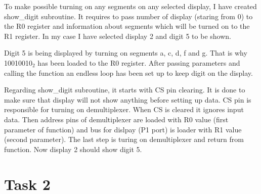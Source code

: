 \documentclass{article}
\begin{document}
To make possible turning on any segments on any selected display, I have created show\_digit
subroutine. It requires to pass number of display (staring from 0) to the R0 register
and information about segments which will be turned on to the R1 register. In my case
I have selected display 2 and digit 5 to be shown.

Digit 5 is being displayed by turning on segments a, c, d, f and g. That is why
10010010$_2$ has been loaded to the R0 register. After passing parameters and calling the function
an endless loop has been set up to keep digit on the display.

Regarding show\_digit subroutine, it starts with CS pin clearing. It is done to make sure
that display will not show anything before setting up data. CS pin is responsible for
turning on demultiplexer. When CS is cleared it ignores input data. Then address pins
of demultiplexer are loaded with R0 value (first parameter of function) and bus for dislpay
(P1 port) is loader with R1 value (second parameter). The last step is turing on demultiplexer
and return from function. Now display 2 should show digit 5.

\section{Task 2}
\end{document}
